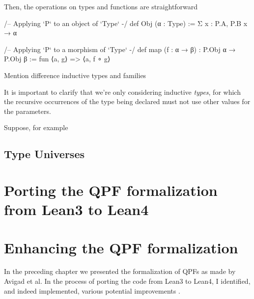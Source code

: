 \documentclass[titlepage]{report}
\newenvironment{remark}[1][Remark:]{\begin{trivlist}                         
    \item[\hskip \labelsep {\bfseries #1}]}{\end{trivlist}}
\newenvironment{todo}[1][Todo:]{\begin{trivlist}                         
    \item[\hskip \labelsep {\bfseries #1}]}{\end{trivlist}}
\begin{document}
Then, the operations on types and functions are straightforward
\begin{leancode}
    /-- Applying `P` to an object of `Type` -/
    def Obj (α : Type)
        := Σ x : P.A, P.B x → α

    /-- Applying `P` to a morphism of `Type` -/
    def map (f : α → β) : P.Obj α → P.Obj β :=
        fun ⟨a, g⟩ => ⟨a, f ∘ g⟩
\end{leancode}

\begin{remark}
    
\end{remark}











\begin{todo}
    Mention difference inductive types and families

    It is important to clarify that we're only considering inductive \emph{types}, 
for which the recursive occurrences of the type being declared must not use other values for the 
parameters.

Suppose, for example 
\end{todo}








\section{Type Universes}
\label{sec:bg:universes}





\chapter{Porting the QPF formalization from Lean3 to Lean4}
\label{ch:porting}








\chapter{Enhancing the QPF formalization}
\label{ch:enhancing}


In the preceding chapter we presented the formalization of QPFs as made by Avigad et al.
In the process of porting the code from Lean3 to Lean4, 
I identified, and indeed implemented, various potential improvements . 
\end{document}
